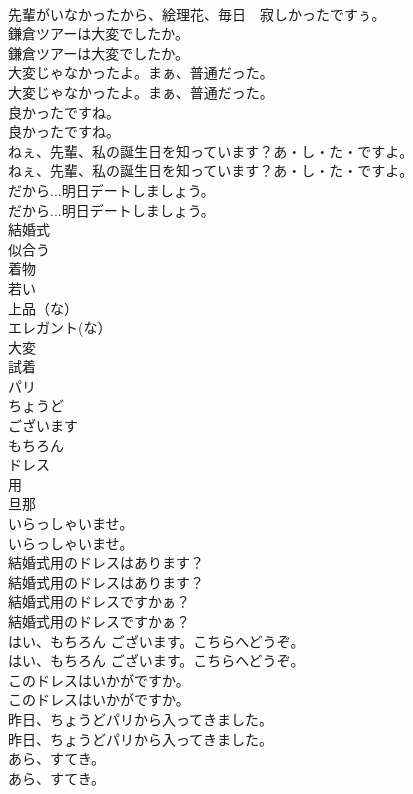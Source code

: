 \documentclass[8pt]{extreport}
\begin{document}
\begin{CJK}{UTF8}{min}
\\	先輩がいなかったから、絵理花、毎日　寂しかったですぅ。 
\\	鎌倉ツアーは大変でしたか。	
\\	鎌倉ツアーは大変でしたか。 
\\	大変じゃなかったよ。まぁ、普通だった。	
\\	大変じゃなかったよ。まぁ、普通だった。 
\\	良かったですね。	
\\	良かったですね。 
\\	ねぇ、先輩、私の誕生日を知っています？あ・し・た・ですよ。	
\\	ねぇ、先輩、私の誕生日を知っています？あ・し・た・ですよ。 
\\	だから...明日デートしましょう。	
\\	だから...明日デートしましょう。 
\\	結婚式
\\	似合う
\\	着物
\\	若い
\\	上品（な）
\\	エレガント(な）
\\	大変
\\	試着
\\	パリ
\\	ちょうど
\\	ございます
\\	もちろん
\\	ドレス
\\	用
\\	旦那
\\	いらっしゃいませ。	
\\	いらっしゃいませ。 
\\	結婚式用のドレスはあります？	
\\	結婚式用のドレスはあります？ 
\\	結婚式用のドレスですかぁ？	
\\	結婚式用のドレスですかぁ？ 
\\	はい、もちろん ございます。こちらへどうぞ。	
\\	はい、もちろん ございます。こちらへどうぞ。 
\\	このドレスはいかがですか。	
\\	このドレスはいかがですか。 
\\	昨日、ちょうどパリから入ってきました。	
\\	昨日、ちょうどパリから入ってきました。 
\\	あら、すてき。	
\\	あら、すてき。 

\end{CJK}
\end{document}
